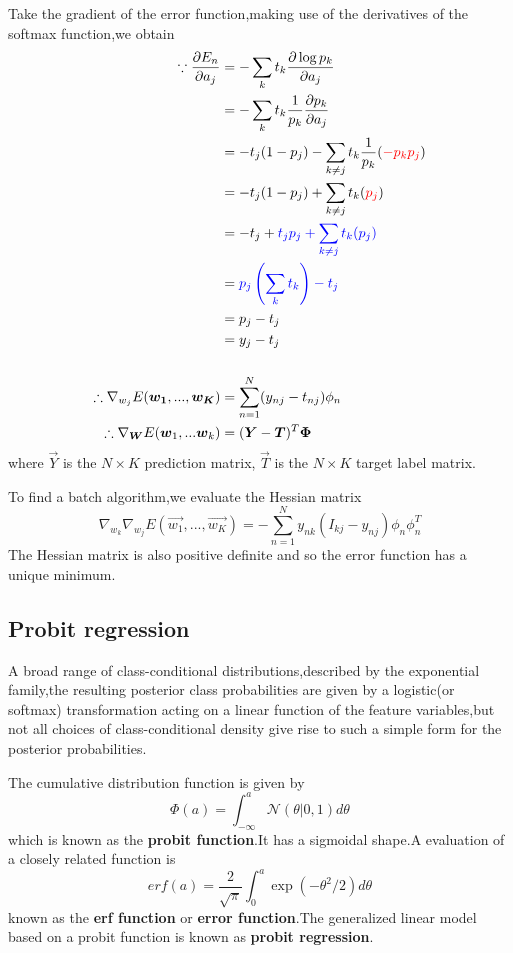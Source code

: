 Take the gradient of the error function,making use of the derivatives of the softmax function,we obtain
\begin{align}
\because
\frac{\partial E_n}{\partial a_j}
&=-\sum_kt_k\frac{\partial \log p_k}{\partial a_j}\\
&=-\sum_kt_k\frac{1}{p_k}\frac{\partial p_k}{\partial a_j}\\
&=-t_j(1-p_j)-\sum_{k\neq j}t_k\frac{1}{p_k}({\color{red}{-p_kp_j}})\\
&=-t_j(1-p_j)+\sum_{k\neq j}t_k({\color{red}{p_j}})\\
&=-t_j+\color{blue}{t_jp_j+\sum_{k\neq j}t_k({p_j})}\\
&=\color{blue}{p_j\left(\sum_kt_k\right)}-t_j \\
&=p_j-t_j \\
&=y_j-t_j \\
\\
\therefore
\nabla_{w_j}E(\vec{w_1},...,\vec{w_K}) &=
\sum_{n=1}^{N}(y_{nj}-t_{nj})\phi_n \\
\therefore
\nabla_{\vec{W}}E(\vec{w}_1,...\vec{w}_k) &= (\vec{Y}-\vec{T})^T\vec{\Phi}
\end{align}
where $\vec{Y}$ is the $N\times K$ prediction matrix, $\vec{T}$ is the $N\times K$ target label matrix.
\begin{equation}
\end{equation}

To find a batch algorithm,we evaluate the Hessian matrix
\begin{equation}
\nabla_{w_k}\nabla_{w_j}E(\vec{w_1},...,\vec{w_K})
=-\sum_{n=1}^{N}y_{nk}(I_{kj}-y_{nj})\phi_n\phi_n^T
\end{equation}
The Hessian matrix is also positive definite and so the error function has a unique minimum.

\subsection{Probit regression}
A broad range of class-conditional distributions,described by the exponential family,the resulting posterior class probabilities are given by a logistic(or softmax) transformation acting on a linear function of the feature variables,but not all choices of class-conditional density give rise to such a simple form for the posterior probabilities.

The cumulative distribution function is given by
\begin{equation}
	\Phi(a) = \int_{-\infty}^{a}\mathcal{N}(\theta|0,1)d\theta
\end{equation}
which is known as the \textbf{probit function}.It has a sigmoidal shape.A evaluation of a closely related function is
\begin{equation}
erf(a) = \dfrac{2}{\sqrt{\pi}}\int_{0}^{a}\exp(-\theta^2/2)d\theta
\end{equation}
known as the \textbf{erf function} or \textbf{error function}.The generalized linear model based on a probit function is known as \textbf{probit regression}.

